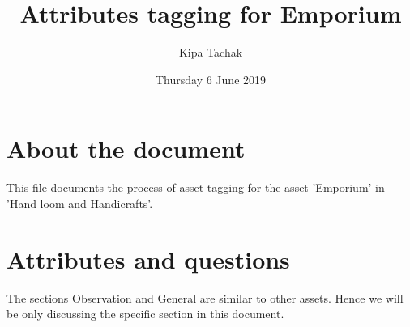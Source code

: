 \documentclass[oneside,twocolumn]{article}
\title{Attributes tagging for Emporium}
\author{Kipa Tachak}
\date{Thursday  6 June 2019}
\begin{document}
\maketitle

\section{About the document}
This file documents the process of asset tagging for the asset 'Emporium' in 'Hand loom and Handicrafts'.

\section{Attributes and questions}
The sections Observation and General are similar to other assets. Hence we will be only discussing the specific section in this document.
\end{document}
